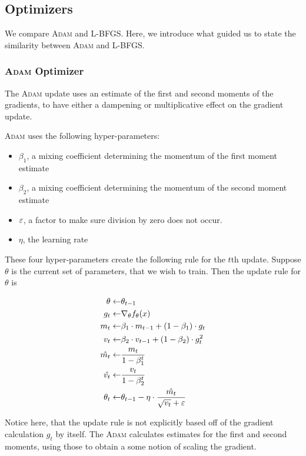 \documentclass[11pt]{article}
\begin{document}
\subsection{Optimizers}
We compare \textsc{Adam} and \textsc{L-BFGS}.
Here, we introduce what guided us to state the similarity between \textsc{Adam} and \textsc{L-BFGS}.
\subsubsection{\textsc{Adam} Optimizer}
The \textsc{Adam} update uses an estimate of the first and second moments of the gradients, to have either a dampening or multiplicative effect on the gradient update.

\textsc{Adam} uses the following hyper-parameters:
\begin{itemize}
\item $\beta_1$, a mixing coefficient determining the momentum of the first moment estimate
\item $\beta_2$, a mixing coefficient determining the momentum of the second moment estimate
\item $\varepsilon$, a factor to make sure division by zero does not occur.
\item $\eta$, the learning rate
\end{itemize}

These four hyper-parameters create the following rule for the $t$th update.
Suppose $\theta$ is the current set of parameters, that we wish to train. Then the update rule for $\theta$ is

\begin{align*}
  \theta \leftarrow & \theta_{t-1} \\
  g_t \leftarrow & \nabla_\theta f_\theta(x) \\
  m_t \leftarrow & \beta_1 \cdot m_{t-1} + (1 - \beta_1) \cdot g_t \\
  v_t \leftarrow & \beta_2 \cdot v_{t-1} + (1 - \beta_2) \cdot g_t^2 \\
  \hat{m_t} \leftarrow & \frac{m_t}{1 - \beta_1^t} \\
  \hat{v_t} \leftarrow & \frac{v_t}{1 - \beta_2^t} \\
  \theta_t \leftarrow & \theta_{t-1} - \eta \cdot \frac{\hat{m_t}}{\sqrt{v_t} + \varepsilon}
\end{align*}

Notice here, that the update rule is not explicitly based off of the gradient calculation $g_t$ by itself.
The \textsc{Adam} calculates estimates for the first and second moments, using those to obtain a some notion of scaling the gradient.
\end{document}
